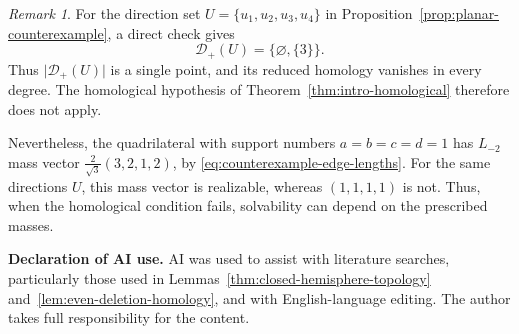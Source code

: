 \documentclass[12pt,reqno]{amsart}
\numberwithin{equation}{section}
\theoremstyle{remark}
\newtheorem{remark}[theorem]{Remark}
\newcommand{\Dcal}{\mathcal D}
\begin{document}
\begin{remark}
	For the direction set
	\(U=\{u_1,u_2,u_3,u_4\}\) in
	Proposition~\ref{prop:planar-counterexample}, a direct check gives
	\[
	\Dcal_+(U)=\{\varnothing,\{3\}\}.
	\]
	Thus \(\lvert\Dcal_+(U)\rvert\) is a single point, and its reduced
	homology vanishes in every degree. The homological hypothesis of
	Theorem~\ref{thm:intro-homological} therefore does not apply.
	
Nevertheless, the quadrilateral with support numbers
\(a=b=c=d=1\) has \(L_{-2}\) mass vector
\(\frac{2}{\sqrt3}(3,2,1,2)\), by
\eqref{eq:counterexample-edge-lengths}.
For the same directions \(U\), this mass vector is realizable,
whereas \((1,1,1,1)\) is not.
Thus, when the homological condition fails, solvability can
depend on the prescribed masses.
\end{remark}








\par\medskip
\noindent\textbf{Declaration of AI use.}
AI was used to assist with literature searches, particularly those used in Lemmas~\ref{thm:closed-hemisphere-topology}
and~\ref{lem:even-deletion-homology}, and with English-language
editing.
The author takes full responsibility for the content.
\end{document}
